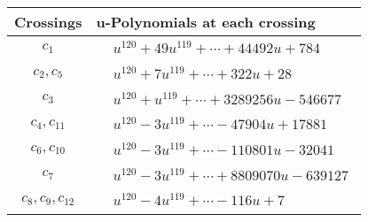 \documentclass[1p]{elsarticle_modified}
\theoremstyle{definition}
\begin{document}
\begin{tabular}{m{50pt}|m{274pt}}
Crossings & \hspace{64pt}u-Polynomials at each crossing \\
\hline $$\begin{aligned}c_{1}\end{aligned}$$&$\begin{aligned}
&u^{120}+49 u^{119}+\cdots+44492 u+784
\end{aligned}$\\
\hline $$\begin{aligned}c_{2},c_{5}\end{aligned}$$&$\begin{aligned}
&u^{120}+7 u^{119}+\cdots+322 u+28
\end{aligned}$\\
\hline $$\begin{aligned}c_{3}\end{aligned}$$&$\begin{aligned}
&u^{120}+u^{119}+\cdots+3289256 u-546677
\end{aligned}$\\
\hline $$\begin{aligned}c_{4},c_{11}\end{aligned}$$&$\begin{aligned}
&u^{120}-3 u^{119}+\cdots-47904 u+17881
\end{aligned}$\\
\hline $$\begin{aligned}c_{6},c_{10}\end{aligned}$$&$\begin{aligned}
&u^{120}-3 u^{119}+\cdots-110801 u-32041
\end{aligned}$\\
\hline $$\begin{aligned}c_{7}\end{aligned}$$&$\begin{aligned}
&u^{120}-3 u^{119}+\cdots+8809070 u-639127
\end{aligned}$\\
\hline $$\begin{aligned}c_{8},c_{9},c_{12}\end{aligned}$$&$\begin{aligned}
&u^{120}-4 u^{119}+\cdots-116 u+7
\end{aligned}$\\
\hline
\end{tabular}\\~\\
\end{document}
